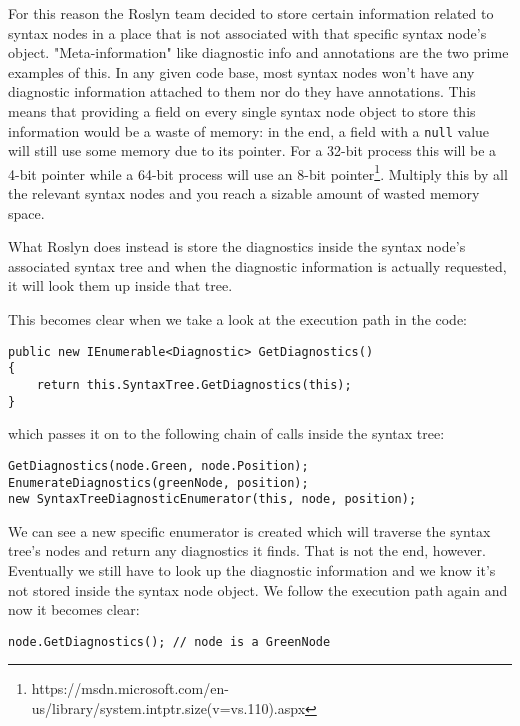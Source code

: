 For this reason the Roslyn team decided to store certain information related to syntax nodes in a place that is not associated with that specific syntax node's object.\parencite{Sadov2014} "Meta-information" like diagnostic info and annotations are the two prime examples of this. In any given code base, most syntax nodes won't have any diagnostic information attached to them nor do they have annotations. This means that providing a field on every single syntax node object to store this information would be a waste of memory: in the end, a field with a \verb|null| value will still use some memory due to its pointer. For a 32-bit process this will be a 4-bit pointer while a 64-bit process will use an 8-bit pointer\footnote{https://msdn.microsoft.com/en-us/library/system.intptr.size(v=vs.110).aspx}. Multiply this by all the relevant syntax nodes and you reach a sizable amount of wasted memory space.

What Roslyn does instead is store the diagnostics inside the syntax node's associated syntax tree and when the diagnostic information is actually requested, it will look them up inside that tree.

\noindent This becomes clear when we take a look at the execution path in the code:

\begin{lstlisting}
public new IEnumerable<Diagnostic> GetDiagnostics()
{
	return this.SyntaxTree.GetDiagnostics(this);
}
\end{lstlisting}

\noindent which passes it on to the following chain of calls inside the syntax tree:

\begin{lstlisting}
GetDiagnostics(node.Green, node.Position);
EnumerateDiagnostics(greenNode, position);
new SyntaxTreeDiagnosticEnumerator(this, node, position);
\end{lstlisting}

\noindent We can see a new specific enumerator is created which will traverse the syntax tree's nodes and return any diagnostics it finds. That is not the end, however. Eventually we still have to look up the diagnostic information and we know it's not stored inside the syntax node object. We follow the execution path again and now it becomes clear:

\begin{lstlisting}
node.GetDiagnostics(); // node is a GreenNode
\end{lstlisting}

